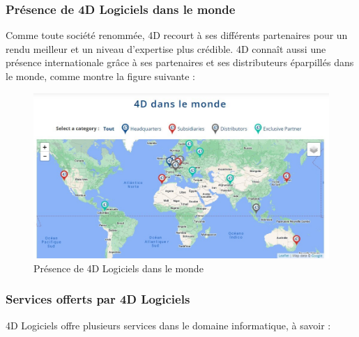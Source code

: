 \subsubsection{Présence de 4D Logiciels dans le monde}
Comme toute société renommée, 4D recourt à ses différents partenaires pour un rendu
meilleur et un niveau d’expertise plus crédible. 4D connaît aussi une présence 
internationale grâce à ses partenaires et ses distributeurs éparpillés dans le monde, 
comme montre la figure suivante :


\begin{figure}[h]
    \centering
    \includegraphics[scale=0.6]{Images/carte.jpg} %
    \caption{Présence de 4D Logiciels dans le monde}
    \label{fig:carte}
\end{figure}

\vspace{3cm}

\subsubsection{Services offerts par 4D Logiciels}
4D Logiciels offre plusieurs services dans le domaine informatique, à savoir :
\\ 

